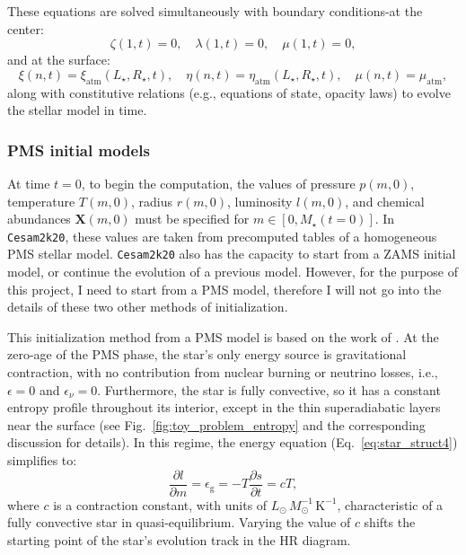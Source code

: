 \documentclass[12pt,a4paper]{article}
\newcommand{\mr}{\mathrm}
\newcommand{\pfird}[2][]{\frac{\partial#1}{\partial#2}}
\newcommand{\bvec}[1]{\boldsymbol{#1}}
\begin{document}
These equations are solved simultaneously with boundary conditions-at the center:
\begin{equation}
  \zeta(1, t) = 0,\quad \lambda(1, t) =0, \quad \mu(1, t) = 0,
\end{equation}
and at the surface:
\begin{equation}
  \xi(n, t) = \xi_\mr{atm}(L_\star, R_\star, t),\quad \eta(n, t) = \eta_\mr{atm}(L_\star, R_\star, t),\quad \mu(n, t) = \mu_\mr{atm},
\end{equation}
along with constitutive relations (e.g., equations of state, opacity laws) to evolve the stellar model in time.

\subsubsection{PMS initial models}
\label{sec:pms_initial_models}

At time $t = 0$, to begin the computation, the values of pressure $p(m, 0)$, temperature $T(m, 0)$, radius $r(m, 0)$, luminosity $l(m, 0)$, and chemical abundances $\bvec{X}(m, 0)$ must be specified for $m \in [0, M_\star(t=0)]$. In \texttt{Cesam2k20}, these values are taken from precomputed tables of a homogeneous PMS stellar model. \texttt{Cesam2k20} also has the capacity to start from a ZAMS initial model, or continue the evolution of a previous model. However, for the purpose of this project, I need to start from a PMS model, therefore I will not go into the details of these two other methods of initialization. 

This initialization method from a PMS model is based on the work of \textcite{Iben1965a}. At the zero-age of the PMS phase, the star's only energy source is gravitational contraction, with no contribution from nuclear burning or neutrino losses, i.e., $\epsilon = 0$ and $\epsilon_\nu = 0$. Furthermore, the star is fully convective, so it has a constant entropy profile throughout its interior, except in the thin superadiabatic layers near the surface (see Fig.~\ref{fig:toy_problem_entropy} and the corresponding discussion for details). In this regime, the energy equation (Eq.~\eqref{eq:star_struct4}) simplifies to:
\begin{equation}
  \pfird[l]{m} = \epsilon_\mr{g} = -T\pfird[s]{t} = cT,
\end{equation}
where $c$ is a contraction constant, with units of $L_\odot\,M_\odot^{-1}\,\mr{K}^{-1}$, characteristic of a fully convective star in quasi-equilibrium. Varying the value of $c$ shifts the starting point of the star's evolution track in the HR diagram.
\end{document}
